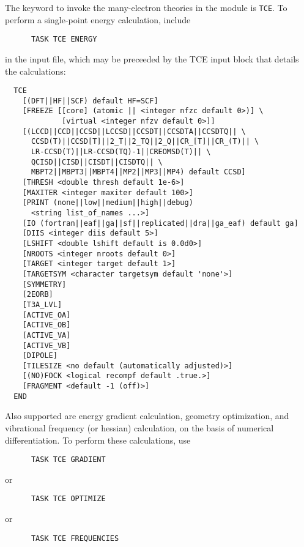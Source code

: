 The keyword to invoke the many-electron theories in the module is
\verb+TCE+.  To perform a single-point energy calculation, include
\begin{verbatim}
      TASK TCE ENERGY
\end{verbatim}
in the input file, which may be preceeded by the TCE input block
that details the calculations:
\begin{verbatim}
  TCE
    [(DFT||HF||SCF) default HF=SCF]
    [FREEZE [[core] (atomic || <integer nfzc default 0>)] \
             [virtual <integer nfzv default 0>]]
    [(LCCD||CCD||CCSD||LCCSD||CCSDT||CCSDTA||CCSDTQ|| \
      CCSD(T)||CCSD[T]||2_T||2_TQ||2_Q||CR_[T]||CR_(T)|| \
      LR-CCSD(T)||LR-CCSD(TQ)-1||CREOMSD(T)|| \
      QCISD||CISD||CISDT||CISDTQ|| \
      MBPT2||MBPT3||MBPT4||MP2||MP3||MP4) default CCSD]
    [THRESH <double thresh default 1e-6>]
    [MAXITER <integer maxiter default 100>]
    [PRINT (none||low||medium||high||debug)
      <string list_of_names ...>]
    [IO (fortran||eaf||ga||sf||replicated||dra||ga_eaf) default ga]
    [DIIS <integer diis default 5>]
    [LSHIFT <double lshift default is 0.0d0>]
    [NROOTS <integer nroots default 0>]
    [TARGET <integer target default 1>]
    [TARGETSYM <character targetsym default 'none'>]
    [SYMMETRY]
    [2EORB]
    [T3A_LVL] 
    [ACTIVE_OA]
    [ACTIVE_OB]
    [ACTIVE_VA]
    [ACTIVE_VB]
    [DIPOLE]
    [TILESIZE <no default (automatically adjusted)>]
    [(NO)FOCK <logical recompf default .true.>]
    [FRAGMENT <default -1 (off)>]
  END
\end{verbatim}
Also supported are energy gradient calculation, geometry optimization,
and vibrational frequency (or hessian) calculation, on the basis of
numerical differentiation.  To perform these calculations, use
\begin{verbatim}
      TASK TCE GRADIENT
\end{verbatim}
or
\begin{verbatim}
      TASK TCE OPTIMIZE
\end{verbatim}
or
\begin{verbatim}
      TASK TCE FREQUENCIES
\end{verbatim}

